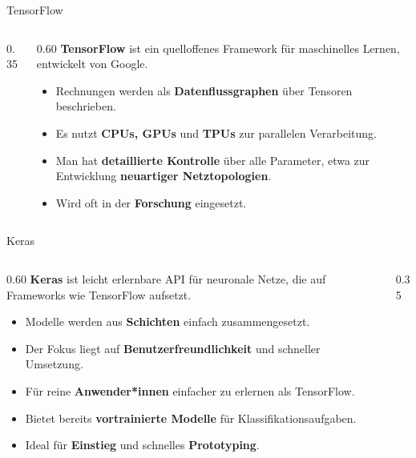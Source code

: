 \begin{frame}{TensorFlow}
\begin{columns}
\begin{column}{0.35\textwidth}
\centering

\end{column}
\begin{column}{0.60\textwidth}
\textbf{TensorFlow} ist ein quelloffenes Framework für maschinelles Lernen, entwickelt von Google.
\begin{itemize}
\item Rechnungen werden als \textbf{Datenflussgraphen} über Tensoren beschrieben.
\item Es nutzt \textbf{CPUs, GPUs} und \textbf{TPUs} zur parallelen Verarbeitung.
\item Man hat \textbf{detaillierte Kontrolle} über alle Parameter, etwa zur Entwicklung \textbf{neuartiger Netztopologien}.
\item Wird oft in der \textbf{Forschung} eingesetzt.
\end{itemize}
\end{column}
\end{columns}
\end{frame}


\begin{frame}{Keras}
\begin{columns}
\begin{column}{0.60\textwidth}
\textbf{Keras} ist leicht erlernbare API für neuronale Netze, die auf Frameworks wie TensorFlow aufsetzt.
\begin{itemize}
\item Modelle werden aus \textbf{Schichten} einfach zusammengesetzt.
\item Der Fokus liegt auf \textbf{Benutzerfreundlichkeit} und schneller Umsetzung.
\item Für reine \textbf{Anwender*innen} einfacher zu erlernen als TensorFlow.
\item Bietet bereits \textbf{vortrainierte Modelle} für Klassifikationsaufgaben.
\item Ideal für \textbf{Einstieg} und schnelles \textbf{Prototyping}.
\end{itemize}
\end{column}
\begin{column}{0.35\textwidth}
\centering

\end{column}

\end{columns}
\end{frame}

